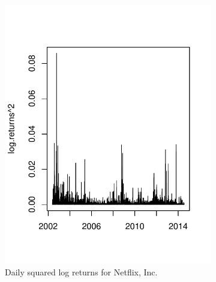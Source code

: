 \begin{figure}[htbp]
\begin{subfigure}[t]{0.4\textwidth}
                \includegraphics[width=\textwidth]{./chapter-1-introduction/Netflix-daily-squared-log-returns.pdf}
                \caption{Daily squared log returns for Netflix, Inc.}
                \label{fig:netflix-returns}
        \end{subfigure}%
        \quad %
        \begin{subfigure}[t]{0.4\textwidth}

\end{subfigure}
\end{figure}

